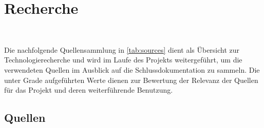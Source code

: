 \documentclass[main.tex]{subfiles} %
\begin{document}

\section{Recherche}~\label{appendix:Recherche}

\noindent
Die nachfolgende Quellensammlung in \autoref{tab:sources} dient als Übersicht
zur Technologierecherche und wird im Laufe des Projekts
weitergeführt, um die verwendeten Quellen im Ausblick auf die
Schlussdokumentation zu sammeln. Die unter Grade aufgeführten Werte
dienen zur Bewertung der Relevanz der Quellen für das Projekt und
deren weiterführende Benutzung.

\subsection*{Quellen}
\end{document}
